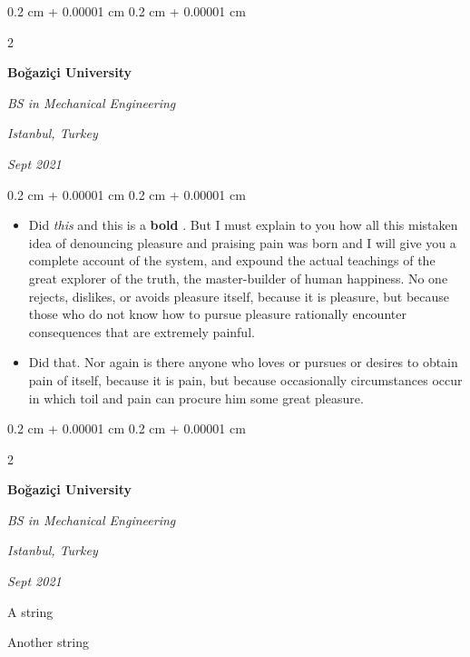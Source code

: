 \documentclass[10pt, letterpaper]{article}
\newenvironment{summary}{
    \begin{description}[
        topsep=0.10 cm,
        parsep=0.10 cm,
        partopsep=0pt,
        itemsep=0pt,
        leftmargin=0.4 cm + 10pt
    ]
}{
    \end{description}
} %
\newenvironment{highlights}{
    \begin{itemize}[
        topsep=0.10 cm,
        parsep=0.10 cm,
        partopsep=0pt,
        itemsep=0pt,
        leftmargin=0.4 cm + 10pt
    ]
}{
    \end{itemize}
} %
\newenvironment{onecolentry}{
    \begin{adjustwidth}{
        0.2 cm + 0.00001 cm
    }{
        0.2 cm + 0.00001 cm
    }
}{
    \end{adjustwidth}
} %
\newenvironment{twocolentry}[2][]{
    \onecolentry
    \def\secondColumn{#2}
    \setcolumnwidth{\fill, 4.5 cm}
    \begin{paracol}{2}
}{
    \switchcolumn \raggedleft \secondColumn
    \end{paracol}
    \endonecolentry
} %
\let\hrefWithoutArrow\href
\renewcommand{\href}[2]{\hrefWithoutArrow{#1}{\ifthenelse{\equal{#2}{}}{ }{#2 }\raisebox{.15ex}{\footnotesize \faExternalLink*}}}
\begin{document}
        \vspace{0.2 cm}

        \begin{twocolentry}{
        \textit{Istanbul, Turkey}    
            
        \textit{Sept 2021}}
            \textbf{Boğaziçi University}

            \textit{BS in Mechanical Engineering}
        \end{twocolentry}
        \vspace{0.10 cm}
        \begin{onecolentry}
            \begin{highlights}
                \item Did \textit{this} and this is a \textbf{bold} \href{https://example.com}{link}. But I must explain to you how all this mistaken idea of denouncing pleasure and praising pain was born and I will give you a complete account of the system, and expound the actual teachings of the great explorer of the truth, the master-builder of human happiness. No one rejects, dislikes, or avoids pleasure itself, because it is pleasure, but because those who do not know how to pursue pleasure rationally encounter consequences that are extremely painful.
                \item Did that. Nor again is there anyone who loves or pursues or desires to obtain pain of itself, because it is pain, but because occasionally circumstances occur in which toil and pain can procure him some great pleasure.
            \end{highlights}
        \end{onecolentry}


        \vspace{0.2 cm}

        \begin{twocolentry}{
        \textit{Istanbul, Turkey}    
            
        \textit{Sept 2021}}
            \textbf{Boğaziçi University}

            \textit{BS in Mechanical Engineering}
        \end{twocolentry}
            \begin{summary}
                \item A string
                \item Another string
            \end{summary}


        \vspace{0.2 cm}
\end{document}
